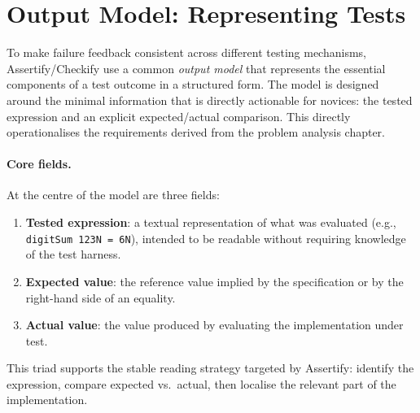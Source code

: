 \section{Output Model: Representing Tests} %
  \label{Output Model: Representing Tests} %


\improve


\begin{justify}
To make failure feedback consistent across different testing mechanisms, Assertify/Checkify use a
common \emph{output model} that represents the essential components of a test outcome in a
structured form. The model is designed around the minimal information that is directly actionable
for novices: the tested expression and an explicit expected/actual comparison.
This directly operationalises the requirements derived from the problem analysis chapter.
\end{justify}


\paragraph{Core fields.}
    \label{Core fields.}
At the centre of the model are three fields:

\begin{enumerate}
    \item \textbf{Tested expression}: a textual representation of what was evaluated
        (e.g., \texttt{digitSum 123N = 6N}), intended to be readable without requiring knowledge of
        the test harness.
    \item \textbf{Expected value}: the reference value implied by the specification or by the
        right-hand side of an equality.
    \item \textbf{Actual value}: the value produced by evaluating the implementation under test.
\end{enumerate}

This triad supports the stable reading strategy targeted by Assertify: identify the
expression, compare expected vs.\ actual, then localise the relevant part of the implementation.


